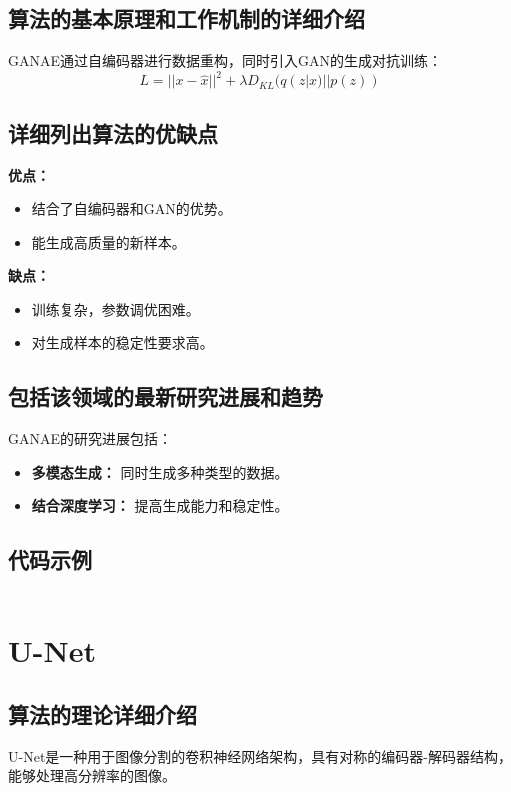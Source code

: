 \subsection*{算法的基本原理和工作机制的详细介绍}
GANAE通过自编码器进行数据重构，同时引入GAN的生成对抗训练：
\[
    L = || x - \hat{x} ||^2 + \lambda D_{KL}(q(z|x) || p(z))
\]

\subsection*{详细列出算法的优缺点}
\textbf{优点：}
\begin{itemize}
    \item 结合了自编码器和GAN的优势。
    \item 能生成高质量的新样本。
\end{itemize}

\textbf{缺点：}
\begin{itemize}
    \item 训练复杂，参数调优困难。
    \item 对生成样本的稳定性要求高。
\end{itemize}

\subsection*{包括该领域的最新研究进展和趋势}
GANAE的研究进展包括：
\begin{itemize}
    \item \textbf{多模态生成：} 同时生成多种类型的数据。
    \item \textbf{结合深度学习：} 提高生成能力和稳定性。
\end{itemize}
\subsection*{代码示例}
\begin{lstlisting}

\end{lstlisting}


\section{U-Net}
\subsection*{算法的理论详细介绍}
U-Net是一种用于图像分割的卷积神经网络架构，具有对称的编码器-解码器结构，能够处理高分辨率的图像。

